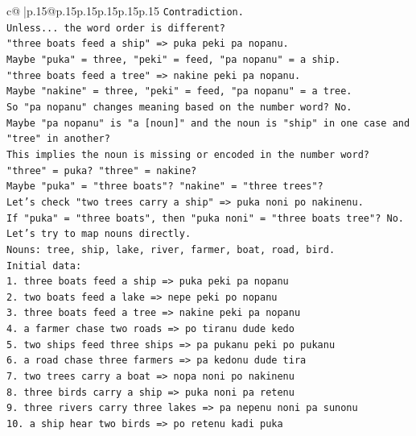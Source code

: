 \documentclass{article}
\begin{document}
{\begin{supertabular}{c@{$\;$}|p{.15\linewidth}@{}p{.15\linewidth}p{.15\linewidth}p{.15\linewidth}p{.15\linewidth}p{.15\linewidth}}
{{{\texttt{Contradiction.} \\
\texttt{Unless... the word order is different?} \\
\texttt{"three boats feed a ship" => puka peki pa nopanu.} \\
\texttt{Maybe "puka" = three, "peki" = feed, "pa nopanu" = a ship.} \\
\texttt{"three boats feed a tree" => nakine peki pa nopanu.} \\
\texttt{Maybe "nakine" = three, "peki" = feed, "pa nopanu" = a tree.} \\
\texttt{So "pa nopanu" changes meaning based on the number word? No.} \\
\texttt{Maybe "pa nopanu" is "a {[}noun{]}" and the noun is "ship" in one case and "tree" in another?} \\
\texttt{This implies the noun is missing or encoded in the number word?} \\
\texttt{"three" = puka? "three" = nakine?} \\
\texttt{Maybe "puka" = "three boats"? "nakine" = "three trees"?} \\
\texttt{Let's check "two trees carry a ship" => puka noni po nakinenu.} \\
\texttt{If "puka" = "three boats", then "puka noni" = "three boats tree"? No.} \\
\texttt{Let's try to map nouns directly.} \\
\texttt{Nouns: tree, ship, lake, river, farmer, boat, road, bird.} \\
\texttt{Initial data:} \\
\texttt{1. three boats feed a ship => puka peki pa nopanu} \\
\texttt{2. two boats feed a lake => nepe peki po nopanu} \\
\texttt{3. three boats feed a tree => nakine peki pa nopanu} \\
\texttt{4. a farmer chase two roads => po tiranu dude kedo} \\
\texttt{5. two ships feed three ships => pa pukanu peki po pukanu} \\
\texttt{6. a road chase three farmers => pa kedonu dude tira} \\
\texttt{7. two trees carry a boat => nopa noni po nakinenu} \\
\texttt{8. three birds carry a ship => puka noni pa retenu} \\
\texttt{9. three rivers carry three lakes => pa nepenu noni pa sunonu} \\
\texttt{10. a ship hear two birds => po retenu kadi puka} \\
}}}
\end{supertabular}}
\end{document}
